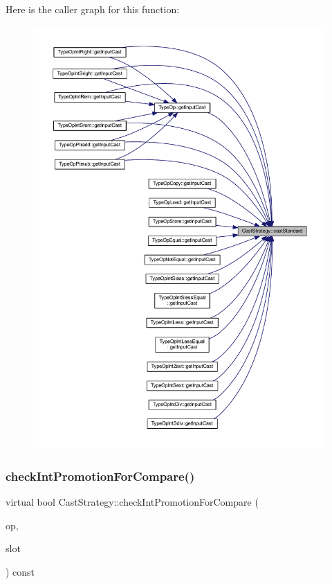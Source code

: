 Here is the caller graph for this function\+:
\nopagebreak
\begin{figure}[H]
\begin{center}
\leavevmode
\includegraphics[width=350pt]{class_cast_strategy_a9ca9d31afeefca9a43cd8114333bcb21_icgraph}
\end{center}
\end{figure}
\mbox{\label{class_cast_strategy_ae91ae0dbea2811795e386298633f05f3}} 
\subsubsection{\texorpdfstring{checkIntPromotionForCompare()}{checkIntPromotionForCompare()}}
{\footnotesize\ttfamily virtual bool Cast\+Strategy\+::check\+Int\+Promotion\+For\+Compare (\begin{DoxyParamCaption}\item[{const \mbox{\hyperlink{class_pcode_op}{Pcode\+Op}} $\ast$}]{op,  }\item[{int4}]{slot }\end{DoxyParamCaption}) const\hspace{0.3cm}{\ttfamily [pure virtual]}}




